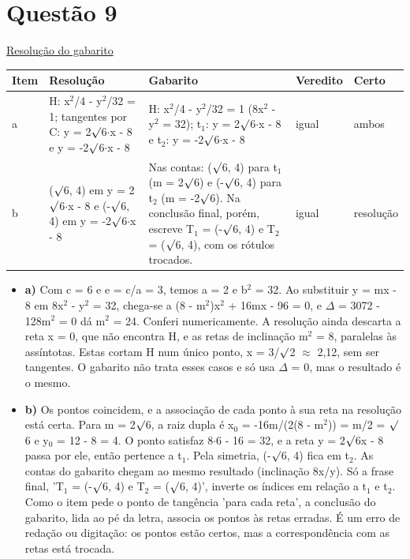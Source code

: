 \documentclass{article}%
\begin{document}
\section*{Questão 9}%
\href{https://poliedroresolve.sistemapoliedro.com.br/vestibulares/ita/2026/ita-2-fase-dia-1-28-10-2025-2-fase-dia-1/dissertativa-9-matematica-2-fase-dia-1-ita-2026}{Resolução do gabarito}\par\smallskip%
\begin{longtable}{@{}p{} p{} p{} p{} p{}@{}}\toprule Item & Resolução & Gabarito & Veredito & Certo \\ \midrule
a & H: x$^2$/4 - y$^2$/32 = 1; tangentes por C: y = 2$\surd$6$\cdot$x - 8 e y = -2$\surd$6$\cdot$x - 8 & H: x$^2$/4 - y$^2$/32 = 1 (8x$^2$ - y$^2$ = 32); t$_{1}$: y = 2$\surd$6$\cdot$x - 8 e t$_{2}$: y = -2$\surd$6$\cdot$x - 8 & igual & ambos \\
b & ($\surd$6, 4) em y = 2$\surd$6$\cdot$x - 8 e (-$\surd$6, 4) em y = -2$\surd$6$\cdot$x - 8 & Nas contas: ($\surd$6, 4) para t$_{1}$ (m = 2$\surd$6) e (-$\surd$6, 4) para t$_{2}$ (m = -2$\surd$6). Na conclusão final, porém, escreve T$_{1}$ = (-$\surd$6, 4) e T$_{2}$ = ($\surd$6, 4), com os rótulos trocados. & igual & resolução \\
\bottomrule\end{longtable}%
\begin{itemize}%
\item%
\textbf{a)} Com c = 6 e e = c/a = 3, temos a = 2 e b$^2$ = 32. Ao substituir y = mx - 8 em 8x$^2$ - y$^2$ = 32, chega{-}se a (8 - m$^2$)x$^2$ + 16mx - 96 = 0, e $\Delta$ = 3072 - 128m$^2$ = 0 dá m$^2$ = 24. Conferi numericamente. A resolução ainda descarta a reta x = 0, que não encontra H, e as retas de inclinação m$^2$ = 8, paralelas às assíntotas. Estas cortam H num único ponto, x = 3/$\surd$2 $\approx$ 2,12, sem ser tangentes. O gabarito não trata esses casos e só usa $\Delta$ = 0, mas o resultado é o mesmo.%
\item%
\textbf{b)} Os pontos coincidem, e a associação de cada ponto à sua reta na resolução está certa. Para m = 2$\surd$6, a raiz dupla é x$_{0}$ = -16m/(2(8 - m$^2$)) = m/2 = $\surd$6 e y$_{0}$ = 12 - 8 = 4. O ponto satisfaz 8$\cdot$6 - 16 = 32, e a reta y = 2$\surd$6x - 8 passa por ele, então pertence a t$_{1}$. Pela simetria, (-$\surd$6, 4) fica em t$_{2}$. As contas do gabarito chegam ao mesmo resultado (inclinação 8x/y). Só a frase final, 'T$_{1}$ = (-$\surd$6, 4) e T$_{2}$ = ($\surd$6, 4)', inverte os índices em relação a t$_{1}$ e t$_{2}$. Como o item pede o ponto de tangência 'para cada reta', a conclusão do gabarito, lida ao pé da letra, associa os pontos às retas erradas. É um erro de redação ou digitação: os pontos estão certos, mas a correspondência com as retas está trocada.%
\end{itemize}%
\end{document}
